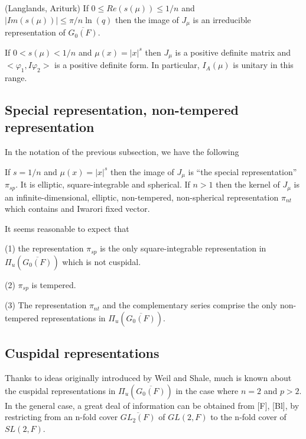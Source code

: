 \begin{lemma}
  (Langlands, Ariturk) If $0\leq Re(s(\mu ))\leq 1/n$ and
  $|Im(s(\mu ))|\leq\pi /n\ln (q)$
  then the image of $J_\mu $ is an irreducible representation
of $\overline{G_0(F)}$.
\end{lemma}

\begin{conjecture}
If $0<s(\mu )<1/n$ and $\mu (x)=|x|^s$ then $J_\mu $ is a positive definite
matrix and $<\varphi _1,I\varphi _2>$ is a positive definite form. In
particular, $I_A(\mu )$ is unitary in this range.
\end{conjecture}

\subsection{Special representation, non-tempered representation}

In the notation of the previous subsection, we have the following

\begin{conjecture}
If $s=1/n$ and $\mu (x)=|x|^s$ then the image of $J_\mu $ is ``the special
representation'' $\pi _{sp}$. It is elliptic, square-integrable and
spherical. If $n>1$ then the kernel of $J_\mu $ is an infinite-dimensional,
elliptic, non-tempered, non-spherical representation $\pi _{nt}$ which
contains and Iwarori fixed vector.
\end{conjecture}

It seems reasonable to expect that

(1) the representation $\pi _{sp}$ is the only square-integrable
representation in $\Pi _u(\overline{G_0(F)})$ which is not cuspidal.

(2) $\pi _{sp}$ is tempered.

(3) The representation $\pi _{nt}$ and the complementary series comprise the
only non-tempered representations in $\Pi _u(\overline{G_0(F)})$.

\subsection{Cuspidal representations}

Thanks to ideas originally introduced by Weil and Shale, much is known about
the cuspidal representations in $\Pi _u(\overline{G_0(F)})$ in the case
where $n=2$ and $p>2$. In the general case, a great deal of information can
be obtained from [F], [Bl], by restricting from an n-fold cover
$\overline{GL_2(F)}$ of $GL(2,F)$ to the n-fold cover of $SL(2,F)$.

